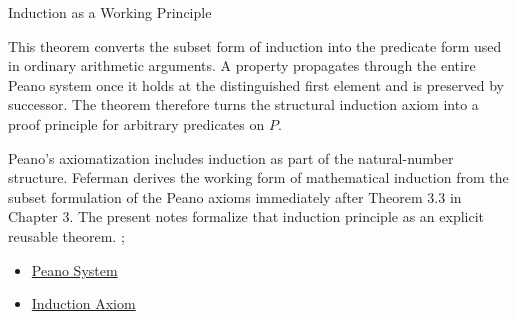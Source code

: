 \begin{topicbox}{Induction as a Working Principle}
\begin{remark*}[Interpretation]
This theorem converts the subset form of induction into the predicate form
used in ordinary arithmetic arguments. A property propagates through the
entire Peano system once it holds at the distinguished first element and is
preserved by successor. The theorem therefore turns the structural induction
axiom into a proof principle for arbitrary predicates on $P$.
\end{remark*}

\begin{remark*}
Peano's axiomatization includes induction as part of the natural-number
structure. Feferman derives the working form of mathematical induction from
the subset formulation of the Peano axioms immediately after Theorem 3.3 in
Chapter 3. The present notes formalize that induction principle as an explicit
reusable theorem. \citep{PeanoArithmeticesPrincipia1889}; \citet{FefermanNumberSystems1964}
\end{remark*}

\begin{dependencies}
\begin{itemize}
  \item \hyperref[def:peano-system]{Peano System}
  \item \hyperref[ax:peano-induction]{Induction Axiom}
\end{itemize}
\end{dependencies}
\end{topicbox}

